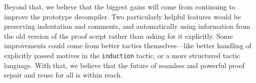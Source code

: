 Beyond that, we believe that the biggest gains will come from continuing to improve the prototype decompiler.
Two particularly helpful features would be preserving indentation and comments, and automatically using information from the old 
version of the proof script rather than asking for it explicitly.
Some improvements could come from better tactics themselves---like better handling of explicitly passed 
motives in the \lstinline{induction} tactic, or a more structured tactic language.
With that, we believe that the future of seamless and powerful proof repair and reuse for all is within reach.



